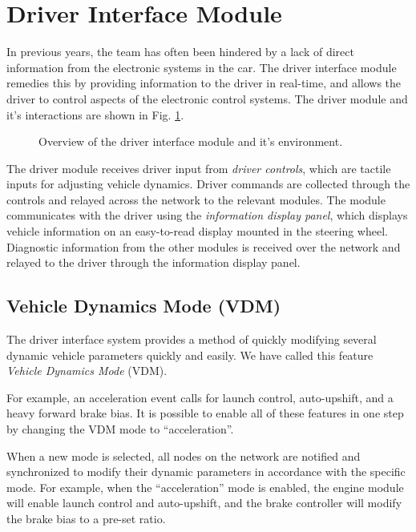 \section{Driver Interface Module\label{sec:Driver-Interface-Module}}

In previous years, the team has often been hindered by a lack of direct information from the electronic systems in the car. The driver interface module remedies this by providing information to the driver in real-time, and allows the driver to control aspects of the electronic control systems. The driver module and it's interactions are shown in Fig. \ref{fig:design_interface_overview_block}.

\begin{figure}[H]
	\centering
	
	\caption{Overview of the driver interface module and it's environment.}
	\label{fig:design_interface_overview_block}
\end{figure}

The driver module receives driver input from \emph{driver controls}, which are tactile inputs for adjusting vehicle dynamics. Driver commands are collected through the controls and relayed across the network to the relevant modules. The module communicates with the driver using the \emph{information display panel}, which displays vehicle information on an easy-to-read display mounted in the steering wheel. Diagnostic information from the other modules is received over the network and relayed to the driver through the information display panel. 

\subsection{Vehicle Dynamics Mode (VDM)}

The driver interface system provides a method of quickly modifying several dynamic vehicle parameters quickly and easily. We have called this feature \emph{Vehicle Dynamics Mode} (VDM). 

For example, an acceleration event calls for launch control, auto-upshift, and a heavy forward brake bias. It is possible to enable all of these features in one step by changing the VDM mode to {}``acceleration''. 

When a new mode is selected, all nodes on the network are notified and synchronized to modify their dynamic parameters in accordance with the specific mode. For example, when the  {}``acceleration'' mode is enabled, the engine module will enable launch control and auto-upshift, and the brake controller will modify the brake bias to a pre-set ratio.

